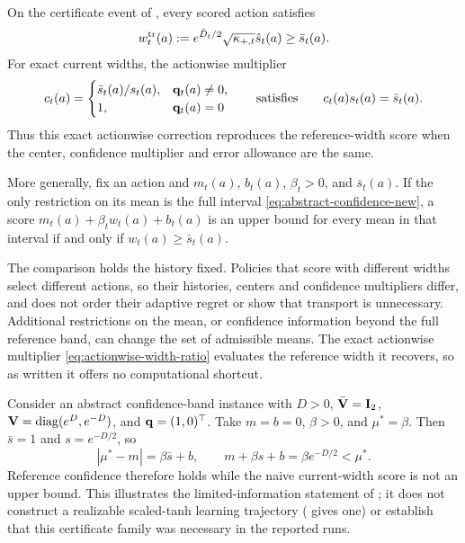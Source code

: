 \begin{proposition}
\label{prop:reference-width-floor}
On the certificate event of , every scored action
satisfies
\begin{equation}\label{eq:reference-width-floor}
 w_t^{\rm tr}(a):=e^{\bar D_t/2}\sqrt{\kappa_{+,t}}\hat s_t(a)
 \ge \bar s_t(a).
\end{equation}
For exact current widths, the actionwise multiplier
\begin{equation}\label{eq:actionwise-width-ratio}
 c_t(a)=\begin{cases}
 \bar s_t(a)/s_t(a),&\mathbf{q}_t(a)\ne0,\\
 1,&\mathbf{q}_t(a)=0
 \end{cases}
 \qquad\text{satisfies}\qquad c_t(a)s_t(a)=\bar s_t(a).
\end{equation}
Thus this exact actionwise correction reproduces the reference-width score when
the center, confidence multiplier and error allowance are the same.

More generally, fix an action and $m_t(a)$, $b_t(a)$, $\beta_t>0$, and
$\bar s_t(a)$.  If the only restriction on its mean is the full interval
\eqref{eq:abstract-confidence-new}, a score
$m_t(a)+\beta_t w_t(a)+b_t(a)$ is an upper bound for every mean in that
interval if and only if $w_t(a)\ge\bar s_t(a)$.
\end{proposition}

The comparison holds the history fixed. Policies that score with different
widths select different actions, so their histories, centers and confidence
multipliers differ, and  does not order their
adaptive regret or show that transport is unnecessary. Additional restrictions
on the mean, or confidence information beyond the full reference band, can
change the set of admissible means. The exact actionwise multiplier
\eqref{eq:actionwise-width-ratio} evaluates the reference width it recovers,
so as written it offers no computational shortcut.

\begin{remark}
\label{rem:naive-width-band-counterexample}
Consider an abstract confidence-band instance with $D>0$,
$\bar{\mathbf{V}}=\mathbf{I}_2$, $\mathbf{V}=\operatorname{diag}(e^D,e^{-D})$, and
$\mathbf{q}=(1,0)^\top$.  Take $m=b=0$, $\beta>0$, and $\mu^*=\beta$.
Then $\bar s=1$ and $s=e^{-D/2}$, so
\[
 |\mu^*-m|=\beta\bar s+b,\qquad
 m+\beta s+b=\beta e^{-D/2}<\mu^*.
\]
Reference confidence therefore holds while the naive current-width score is
not an upper bound.  This illustrates the limited-information statement of
; it does not construct a realizable
scaled-tanh learning trajectory ( gives one) or
establish that this certificate family was
necessary in the reported runs.
\end{remark}

